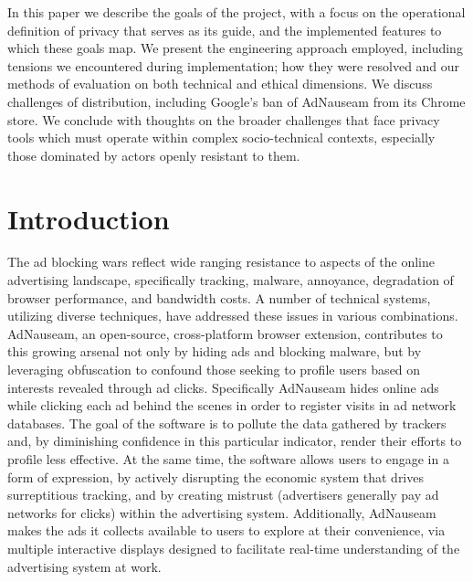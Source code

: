 \documentclass[conference]{IEEEtran}
\begin{document}
\indent In this paper we describe the goals of the project, with a focus on the operational definition of privacy that serves as its guide, and the implemented features to which these goals map. We present the engineering approach employed, including tensions we encountered during implementation; how they were resolved and our methods of evaluation on both technical and ethical dimensions. We discuss challenges of distribution, including Google's ban of AdNauseam from its Chrome store. We conclude with thoughts on the broader challenges that face privacy tools which must operate within complex socio-technical contexts, especially those dominated by actors openly resistant to them.


\IEEEpeerreviewmaketitle

\section{Introduction}

The ad blocking wars \cite{Murphy} reflect wide ranging resistance to aspects of the online advertising landscape, specifically tracking, malware, annoyance, degradation of browser performance, and bandwidth costs. A number of technical systems, utilizing diverse techniques, have addressed these issues in various combinations. AdNauseam, an open-source, cross-platform browser extension, contributes to this growing arsenal not only by hiding ads and blocking malware, but by leveraging obfuscation to confound those seeking to profile users based on interests revealed through ad clicks. Specifically AdNauseam hides online ads while clicking each ad behind the scenes in order to register visits in ad network databases. The goal of the software is to pollute the data gathered by trackers and, by diminishing confidence in this particular indicator, render their efforts to profile less effective. At the same time, the software allows users to engage in a form of expression, by actively disrupting the economic system that drives surreptitious tracking, and by creating mistrust (advertisers generally pay ad networks for clicks) within the advertising system. Additionally, AdNauseam makes the ads it collects available to users to explore at their convenience, via multiple interactive displays designed to facilitate real-time understanding of the advertising system at work.
\end{document}

